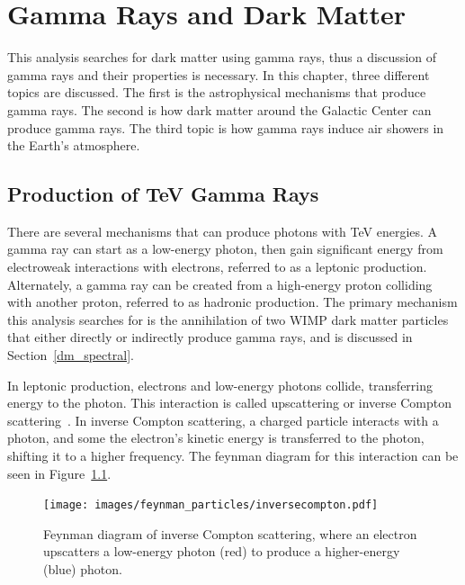 \cleartooddpage[\thispagestyle{empty}]

\newcommand{\Lim}[1]{\raisebox{0.5ex}{\scalebox{0.8}{$\displaystyle \lim_{#1}\;$}}}
\renewcommand{\labelitemi}{\textbullet}
\newcommand{\pip}[1]{$\pi^{+}$}
\newcommand{\pim}[1]{$\pi^{-}$}
\newcommand{\pio}[1]{$\pi^{0}$}
\newcommand{\sv}{\left < \sigma v \right >}

\chapter{Gamma Rays and Dark Matter}\label{ch_gamma}


This analysis searches for dark matter using gamma rays, thus a discussion of gamma rays and their properties is necessary.
In this chapter, three different topics are discussed.
The first is the astrophysical mechanisms that produce gamma rays.
The second is how dark matter around the Galactic Center can produce gamma rays.
The third topic is how gamma rays induce air showers in the Earth's atmosphere.

\section{Production of TeV Gamma Rays}

  There are several mechanisms that can produce photons with TeV energies.
  A gamma ray can start as a low-energy photon, then gain significant energy from electroweak interactions with electrons, referred to as a leptonic production.
  Alternately, a gamma ray can be created from a high-energy proton colliding with another proton, referred to as hadronic production.
  The primary mechanism this analysis searches for is the annihilation of two WIMP dark matter particles that either directly or indirectly produce gamma rays, and is discussed in Section~\ref{dm_spectral}.

  In leptonic production, electrons and low-energy photons collide, transferring energy to the photon.
  This interaction is called upscattering or inverse Compton scattering~\cite{compton_effect}.
  In inverse Compton scattering, a charged particle interacts with a photon, and some the electron's kinetic energy is transferred to the photon, shifting it to a higher frequency.
  The feynman diagram for this interaction can be seen in Figure~\ref{fig:inv_compt_feyn}.
  
  \begin{figure}[ht]
    \centering
    \texttt{[image: images/feynman\_particles/inversecompton.pdf]}
    \caption[Inverse Compton Scattering Feynman Diagram]{
      Feynman diagram of inverse Compton scattering, where an electron upscatters a low-energy photon (red) to produce a higher-energy (blue) photon.
    }
    \label{fig:inv_compt_feyn}
  \end{figure}
  \FloatBarrier
  
